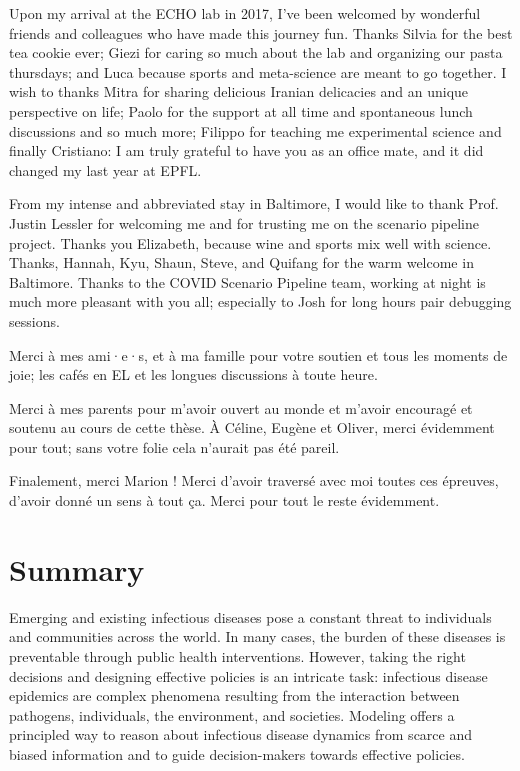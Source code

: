  Upon my arrival at the ECHO lab in 2017, I've been welcomed by wonderful friends and colleagues who have made this journey fun. Thanks Silvia for the best tea cookie ever; Giezi for caring so much about the lab and organizing our pasta thursdays; and Luca because sports and meta-science are meant to go together. I wish to thanks Mitra for sharing delicious Iranian delicacies and an unique perspective on life; Paolo for the support at all time and spontaneous lunch discussions and so much more; Filippo for teaching me experimental science and finally Cristiano: I am truly grateful to have you as an office mate, and it did changed my last year at EPFL.
 
  From my intense and abbreviated stay in Baltimore, I would like to thank Prof. Justin Lessler for welcoming me and for trusting me on the scenario pipeline project. Thanks you Elizabeth, because wine and sports mix well with science. Thanks, Hannah, Kyu, Shaun, Steve, and Quifang for the warm welcome in Baltimore. Thanks to the COVID Scenario Pipeline team, working at night is much more pleasant with you all; especially to Josh for long hours pair debugging sessions.
 
 Merci à mes ami·e·s, et à ma famille pour votre soutien et tous les moments de joie; les cafés en EL et les longues discussions à toute heure.

Merci à mes parents pour m'avoir ouvert au monde et m'avoir encouragé et soutenu au cours de cette thèse.
À Céline, Eugène et Oliver, merci évidemment pour tout; sans votre folie cela n'aurait pas été pareil.

Finalement, merci Marion ! Merci d'avoir traversé avec moi toutes ces épreuves, d'avoir donné un sens à tout ça.%
 Merci pour tout le reste évidemment.
 
 \chapter*{Summary} %
\vspace{-.5cm}
Emerging and existing infectious diseases pose a constant threat to individuals and communities across the world. In many cases, the burden of these diseases is preventable through public health interventions. However, taking the right decisions and designing effective policies is an intricate task: infectious disease epidemics are complex phenomena resulting from the interaction between pathogens, individuals, the environment, and societies. Modeling offers a principled way to reason about infectious disease dynamics from scarce and biased information and to guide decision-makers towards effective policies. 

